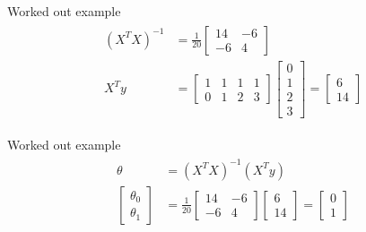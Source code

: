 \documentclass{beamer}
\begin{document}
\begin{frame}{Worked out example}
    \begin{align}
        \begin{split}
            (X^{T}X)^{-1} &= \frac{1}{20} \begin{bmatrix}
                14 & -6\\
                -6& 4
            \end{bmatrix}\\
            X^{T}y &= \begin{bmatrix}
            1&1&1&1\\
            0&1&2&3
            \end{bmatrix}\begin{bmatrix}
            0\\1\\2\\3
            \end{bmatrix}=\begin{bmatrix}
                6\\
                14
            \end{bmatrix}
        \end{split}
    \end{align}
\end{frame}


\begin{frame}{Worked out example}
    \begin{align}
        \begin{split}
            \theta &= (X^{T}X)^{-1}(X^{T}y)\\
           \begin{bmatrix}
        \theta_{0}\\
        \theta_{1}
    \end{bmatrix} &= \frac{1}{20} \begin{bmatrix}
    14 & -6\\
    -6& 4
    \end{bmatrix}\begin{bmatrix}
    6\\
    14
    \end{bmatrix} =
    \begin{bmatrix}
        0\\
        1
    \end{bmatrix} 
        \end{split}
    \end{align}
\end{frame}
\end{document}
